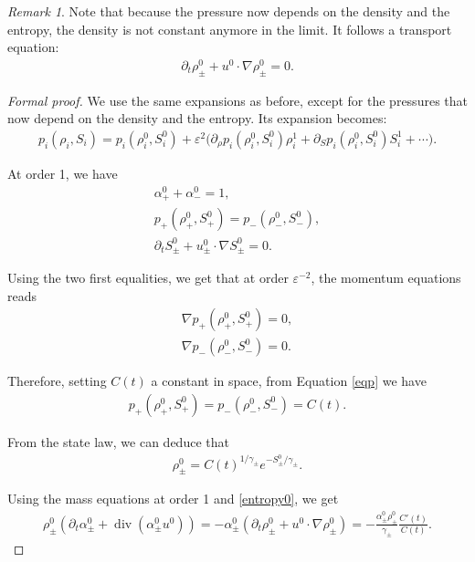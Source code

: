 \documentclass[11pt, twoside, a4paper]{article}
\theoremstyle{plain}
\theoremstyle{remark}
\newtheorem{remark}[theorem]{Remark}
\numberwithin{equation}{section}
\renewcommand{\div}{\operatorname{div}}
\newcommand{\dt}{\partial_t}
\newcommand{\eps}{\varepsilon}
\newcommand{\ap}{\alpha_+}
\newcommand{\am}{\alpha_-}
\newcommand{\rp}{\rho_+}
\newcommand{\rmi}{\rho_-}
\begin{document}
\begin{remark}
Note that because the pressure now depends on the density and the entropy, the density is not constant anymore in the limit. It follows a transport equation: 
\begin{align*}
    \dt \rho_\pm^0 + u^0 \cdot \nabla \rho_\pm^0 =0.
\end{align*}
\end{remark}

\begin{proof}[Formal proof]
We use the same expansions as before, except for the pressures that now depend on the density and the entropy. Its expansion becomes:
\begin{align}
    p_i(\rho_i,S_i) = p_i(\rho_i^0,S_i^0) + \eps^2 \Big( \partial_\rho p_i(\rho_i^0,S_i^0) \rho_i^1 + \partial_S p_i(\rho_i^0,S_i^0) S_i^1 + \cdots \Big).\label{expp}
\end{align}

At order 1, we have
\begin{align}
    \ap^0 + \am^0 = 1,\label{apm0}\\
    p_+ (\rp^0,S_+^0) = p_-(\rmi^0,S_-^0),\label{eqp}\\
    \dt S_\pm^0 + u_\pm^0 \cdot \nabla S_\pm^0 = 0.\label{entropy0}
\end{align}

Using the two first equalities, we get that at order $\eps^{-2}$, the momentum equations reads
\begin{align*}
    \nabla p_+ (\rp^0,S_+^0) = 0,\\
    \nabla p_-(\rmi^0,S_-^0)=0.
\end{align*}

Therefore, setting $C(t)$ a constant in space, from Equation \eqref{eqp} we have
\begin{align*}
     p_+ (\rp^0,S_+^0) = p_-(\rmi^0,S_-^0) = C(t).
\end{align*}

From the state law, we can deduce that
\begin{align*}
    \rho_\pm^0 = C(t)^{1/\gamma_\pm} e^{-S_\pm^0/\gamma_\pm}.
\end{align*}

Using the mass equations at order 1 and \eqref{entropy0}, we get
\begin{align*}
    \rho_\pm^0(\dt \alpha_\pm^0 + \div(\alpha_\pm^0 u^0)) = - \alpha_\pm^0 (\dt \rho_\pm^0 + u^0 \cdot \nabla \rho_\pm^0) = - \frac{\alpha_\pm^0 \rho_\pm^0}{\gamma_\pm} \frac{C'(t)}{C(t)}.
\end{align*}


\end{proof}
\end{document}
